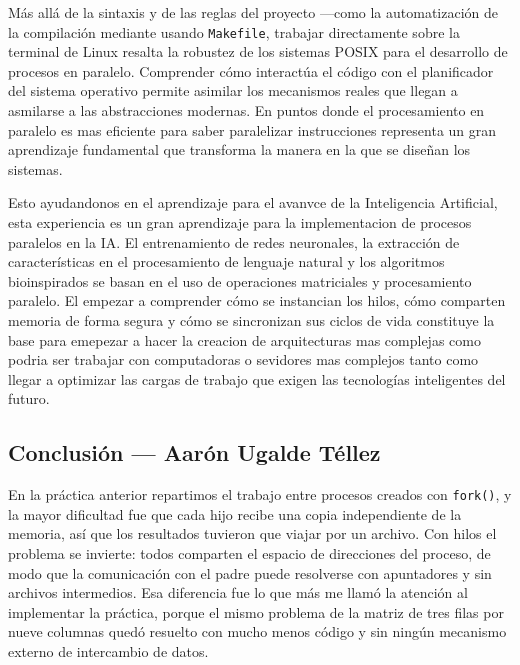 Más allá de la sintaxis y de las reglas del proyecto —como la automatización de la compilación mediante usando \texttt{Makefile}, trabajar directamente sobre la terminal de Linux resalta la robustez de los sistemas POSIX para el desarrollo de procesos en paralelo. Comprender cómo interactúa el código con el planificador del sistema operativo permite asimilar los mecanismos reales que llegan a asmilarse a las abstracciones modernas. En puntos donde el procesamiento en paralelo es mas eficiente para saber paralelizar instrucciones representa un gran aprendizaje fundamental que transforma la manera en la que se diseñan los sistemas.

Esto ayudandonos en el aprendizaje para el avanvce de la Inteligencia Artificial, esta experiencia es un gran aprendizaje para la implementacion de procesos paralelos en la IA. El entrenamiento de redes neuronales, la extracción de características en el procesamiento de lenguaje natural y los algoritmos bioinspirados se basan en el uso de operaciones matriciales y procesamiento paralelo. El empezar a comprender cómo se instancian los hilos, cómo comparten memoria de forma segura y cómo se sincronizan sus ciclos de vida constituye la base para emepezar a hacer la creacion de arquitecturas mas complejas como podria ser trabajar con computadoras o sevidores mas complejos tanto como llegar a optimizar las cargas de trabajo que exigen las tecnologías inteligentes del futuro.

\clearpage
\subsection{Conclusión — Aarón Ugalde Téllez}
\label{sec:prac03:concl:aaron}

En la práctica anterior repartimos el trabajo entre procesos creados con \texttt{fork()}, y la mayor dificultad fue que cada hijo recibe una copia independiente de la memoria, así que los resultados tuvieron que viajar por un archivo. Con hilos el problema se invierte: todos comparten el espacio de direcciones del proceso, de modo que la comunicación con el padre puede resolverse con apuntadores y sin archivos intermedios. Esa diferencia fue lo que más me llamó la atención al implementar la práctica, porque el mismo problema de la matriz de tres filas por nueve columnas quedó resuelto con mucho menos código y sin ningún mecanismo externo de intercambio de datos.

